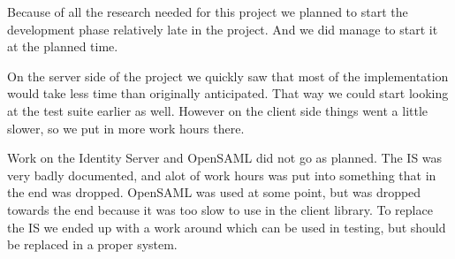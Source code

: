 Because of all the research needed for this project we planned to start the development phase relatively late in the project. And we did manage to start it at the planned time.

On the server side of the project we quickly saw that most of the implementation would take less time than originally anticipated. That way we could start looking at the test suite earlier as well. However on the client side things went a little slower, so we put in more work hours there.

Work on the Identity Server and OpenSAML did not go as planned. The IS was very badly documented, and alot of work hours was put into something that in the end was dropped. OpenSAML was used at some point, but was dropped towards the end because it was too slow to use in the client library. To replace the IS we ended up with a work around which can be used in testing, but should be replaced in a proper system.